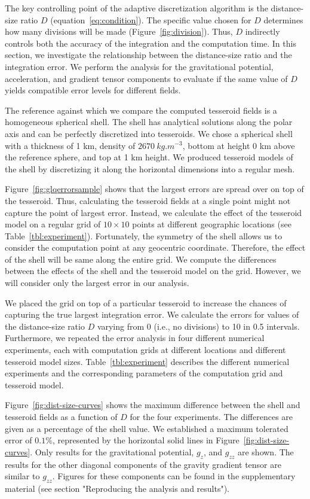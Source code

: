 \documentclass[paper,twocolumn,twoside]{geophysics}
\begin{document}
The key controlling point of the adaptive discretization algorithm
is the distance-size ratio $D$ (equation~\ref{eq:condition}).
The specific value chosen for $D$ determines how many divisions will be made
(Figure~\ref{fig:division}).
Thus, $D$ indirectly controls both the accuracy of the integration
and the computation time.
In this section, we investigate the relationship between
the distance-size ratio and the integration error.
We perform the analysis for the gravitational potential,
acceleration, and gradient tensor components
to evaluate if the same value of $D$ yields compatible error levels
for different fields.

The reference against which we compare the computed tesseroid fields
is a homogeneous spherical shell.
The shell has analytical solutions along the polar axis
\citep{Grombein2013}
and can be perfectly discretized into tesseroids.
We chose a spherical shell with a thickness of 1 km,
density of $2670\ kg.m^{-3}$,
bottom at height 0 km above the reference sphere,
and top at 1 km height.
We produced tesseroid models of the shell by discretizing it along the
horizontal dimensions into a regular mesh.


Figure~\ref{fig:glqerrorsample} shows that the largest errors are spread over
on top of the tesseroid.
Thus, calculating the tesseroid fields at a single point might not
capture the point of largest error.
Instead, we calculate the effect of the tesseroid model on a regular grid
of $10 \times 10$ points at different geographic locations
(see Table~\ref{tbl:experiment}).
Fortunately, the symmetry of the shell allows us to consider the computation
point at any geocentric coordinate.
Therefore, the effect of the shell will be same along the entire grid.
We compute the differences between the effects of the shell and the tesseroid
model on the grid.
However, we will consider only the largest error in our analysis.


We placed the grid on top of a particular tesseroid
to increase the chances of capturing the true largest integration error.
We calculate the errors for values of the distance-size ratio
$D$ varying from 0 (i.e., no divisions) to 10 in 0.5 intervals.
Furthermore, we repeated the error analysis in four different numerical experiments,
each with computation grids at different locations and
different tesseroid model sizes.
Table~\ref{tbl:experiment} describes the different numerical
experiments and the corresponding parameters of the computation grid and
tesseroid model.


Figure~\ref{fig:dist-size-curves} shows
the maximum difference between the shell and tesseroid fields
as a function of $D$ for the four experiments.
The differences are given as a percentage of the shell value.
We established a maximum tolerated error of $0.1\%$, represented by the
horizontal solid lines in Figure~\ref{fig:dist-size-curves}.
Only results for the gravitational potential, $g_z$, and $g_{zz}$ are shown.
The results for the other diagonal components of the gravity gradient tensor
are similar to $g_{zz}$.
Figures for these components can be found in the supplementary material
(see section "Reproducing the analysis and results").
\end{document}
